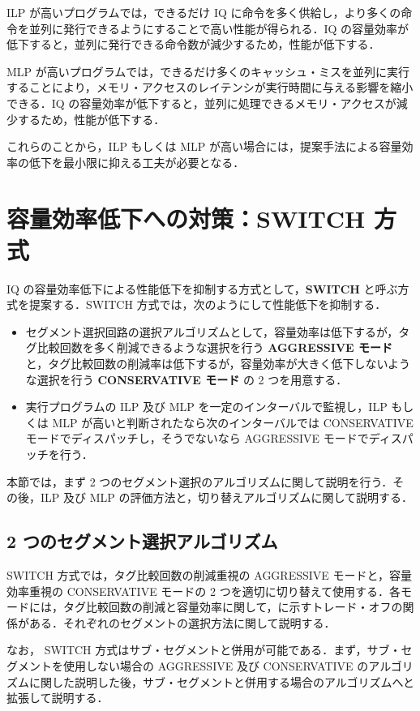 ILP が高いプログラムでは，できるだけ IQ に命令を多く供給し，より多くの命令を並列に発行できるようにすることで高い性能が得られる．IQ の容量効率が低下すると，並列に発行できる命令数が減少するため，性能が低下する．

MLP が高いプログラムでは，できるだけ多くのキャッシュ・ミスを並列に実行することにより，メモリ・アクセスのレイテンシが実行時間に与える影響を縮小できる．IQ の容量効率が低下すると，並列に処理できるメモリ・アクセスが減少するため，性能が低下する．

これらのことから，ILP もしくは MLP が高い場合には，提案手法による容量効率の低下を最小限に抑える工夫が必要となる．

\section{容量効率低下への対策：SWITCH 方式}
\label{sec:switch_scheme}
IQ の容量効率低下による性能低下を抑制する方式として，\textbf{SWITCH} と呼ぶ方式を提案する．SWITCH 方式では，次のようにして性能低下を抑制する．
\begin{itemize}
  \item セグメント選択回路の選択アルゴリズムとして，容量効率は低下するが，タグ比較回数を多く削減できるような選択を行う \textbf{AGGRESSIVE モード} と，タグ比較回数の削減率は低下するが，容量効率が大きく低下しないような選択を行う \textbf{CONSERVATIVE モード} の 2 つを用意する．
  \item 実行プログラムの ILP 及び MLP を一定のインターバルで監視し，ILP もしくは MLP が高いと判断されたなら次のインターバルでは CONSERVATIVE モードでディスパッチし，そうでないなら AGGRESSIVE モードでディスパッチを行う．
\end{itemize}

本節では，まず 2 つのセグメント選択のアルゴリズムに関して説明を行う．その後，ILP 及び MLP の評価方法と，切り替えアルゴリズムに関して説明する．

\subsection{2 つのセグメント選択アルゴリズム}
\label{sec:two_mode}
SWITCH 方式では，タグ比較回数の削減重視の AGGRESSIVE モードと，容量効率重視の CONSERVATIVE モードの 2 つを適切に切り替えて使用する．各モードには，タグ比較回数の削減と容量効率に関して，に示すトレード・オフの関係がある．それぞれのセグメントの選択方法に関して説明する．

なお， SWITCH 方式はサブ・セグメントと併用が可能である．まず，サブ・セグメントを使用しない場合の AGGRESSIVE 及び CONSERVATIVE のアルゴリズムに関した説明した後，サブ・セグメントと併用する場合のアルゴリズムへと拡張して説明する．

